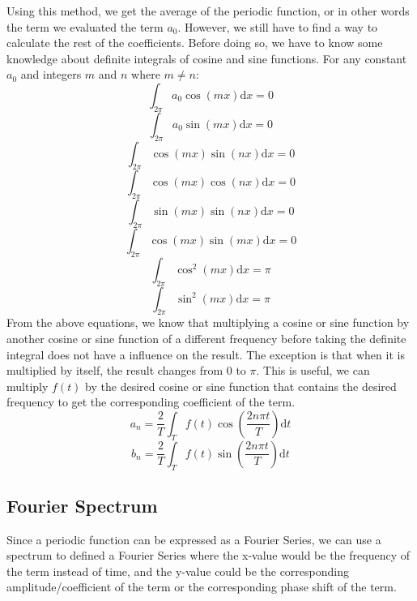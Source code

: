 \indent Using this method, we get the average of the periodic function, 
or in other words the term we evaluated the term $a_0$. However, 
we still have to find a way to calculate the rest of the coefficients.
Before doing so, we have to know some knowledge about definite integrals of cosine and sine functions. 
For any constant $a_0$ and integers $m$ and $n$ where $m\not=n$:
$$      \int_{2\pi} a_0\cos(mx) \mathrm{d}x    =   0            $$
$$      \int_{2\pi} a_0\sin(mx) \mathrm{d}x    =   0            $$
$$      \int_{2\pi} \cos(mx)\sin(nx) \mathrm{d}x    =   0       $$
$$      \int_{2\pi} \cos(mx)\cos(nx) \mathrm{d}x    =   0       $$
$$      \int_{2\pi} \sin(mx)\sin(nx) \mathrm{d}x    =   0       $$
$$      \int_{2\pi} \cos(mx)\sin(mx) \mathrm{d}x    =   0       $$
$$      \int_{2\pi} \cos^2(mx) \mathrm{d}x    =   \pi           $$
$$      \int_{2\pi} \sin^2(mx) \mathrm{d}x    =   \pi           $$
\indent From the above equations, we know that multiplying a cosine or sine function by 
another cosine or sine function of a different frequency before taking the definite integral 
does not have a influence on the result. The exception is that when it is multiplied by itself, 
the result changes from $0$ to $\pi$. This is useful, 
we can multiply $f(t)$ by the desired cosine or sine function that contains the desired frequency 
to get the corresponding coefficient of the term.
\begin{equation}
    a_n =   \frac{2}{T} \int_{T} f(t)\cos(\frac{2n\pi t}{T}) \mathrm{d}t
    \label{equ:trig_fourier_series_cosine_coeff}
\end{equation}
\begin{equation}
    b_n =   \frac{2}{T} \int_{T} f(t)\sin(\frac{2n\pi t}{T}) \mathrm{d}t
    \label{equ:trig_fourier_series_sine_coeff}
\end{equation}








\subsection{Fourier Spectrum}
Since a periodic function can be expressed as a Fourier Series, 
we can use a spectrum to defined a Fourier Series where the x-value would be the frequency of the term instead of time,
and the y-value could be the corresponding amplitude/coefficient of the term 
or the corresponding phase shift of the term. 








